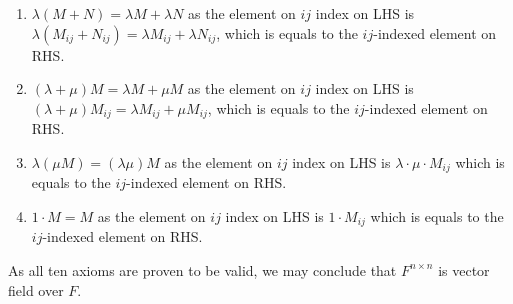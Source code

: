 \documentclass[11pt]{article}
\begin{document}
\begin{enumerate}
    \item $\lambda (M + N) = \lambda M + \lambda N$ as the element on $ij$ index on LHS is $\lambda(M_{ij} + N_{ij}) = \lambda M_{ij} + \lambda N_{ij}$, which is equals to the $ij$-indexed element on RHS.
    \item $(\lambda + \mu) M = \lambda M + \mu M$ as the element on $ij$ index on LHS is $(\lambda + \mu) M_{ij} =\lambda M_{ij} + \mu M_{ij}$, which is equals to the $ij$-indexed element on RHS.
    \item $\lambda (\mu M) = (\lambda \mu) M$ as the element on $ij$ index on LHS is $\lambda \cdot \mu \cdot  M_{ij}$ which is equals to the $ij$-indexed element on RHS.
    \item $1 \cdot M = M$  as the element on $ij$ index on LHS is $1 \cdot M_{ij}$ which is equals to the $ij$-indexed element on RHS.
\end{enumerate}

As all ten axioms are proven to be valid, we may conclude that $F^{n \times n}$ is vector field over $F$.
\end{document}

